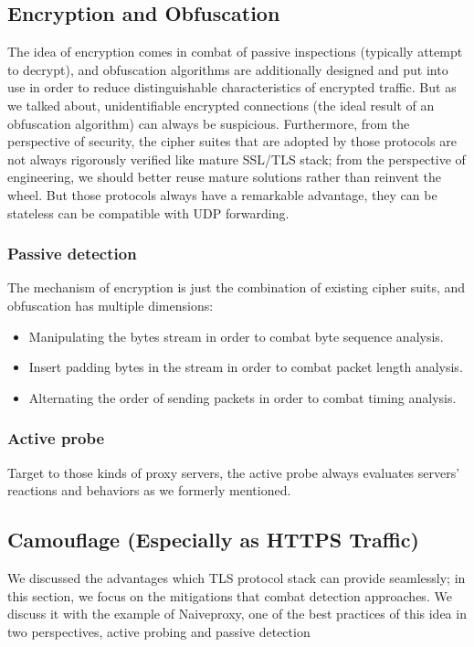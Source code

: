 \documentclass[conference]{IEEEtran}
\begin{document}
\subsection{Encryption and Obfuscation}
The idea of encryption comes in combat of passive inspections (typically attempt to decrypt), and obfuscation algorithms are additionally designed and put into use in order to reduce distinguishable characteristics of encrypted traffic. 
But as we talked about, unidentifiable encrypted connections (the ideal result of an obfuscation algorithm) can always be suspicious. Furthermore, from the perspective of security, the cipher suites that are adopted by those protocols are not always rigorously verified like mature SSL/TLS stack; from the perspective of engineering, we should better reuse mature solutions rather than reinvent the wheel. 
But those protocols always have a remarkable advantage, they can be stateless can be compatible with UDP forwarding.

\subsubsection{Passive detection}
The mechanism of encryption is just the combination of existing cipher suits, and obfuscation has multiple dimensions:
\begin{itemize}
    \item Manipulating the bytes stream in order to combat byte sequence analysis.
    \item Insert padding bytes in the stream in order to combat packet length analysis.
    \item Alternating the order of sending packets in order to combat timing analysis.
\end{itemize}

\subsubsection{Active probe}
Target to those kinds of proxy servers, the active probe always evaluates servers' reactions and behaviors as we formerly mentioned.

\subsection{Camouflage (Especially as HTTPS Traffic)}
We discussed the advantages which TLS protocol stack can provide seamlessly; in this section, we focus on the mitigations that combat detection approaches. We discuss it with the example of Naiveproxy, one of the best practices of this idea in two perspectives, active probing and passive detection
\end{document}
